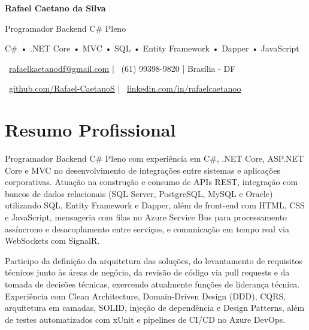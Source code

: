 \documentclass[11pt,a4paper]{article}
\begin{document}

\begin{center}

{\Huge\bfseries Rafael Caetano da Silva}

\vspace{5pt}

{\Large Programador Backend C\# Pleno}

\vspace{4pt}

{\small
C\# • .NET Core • MVC • SQL • Entity Framework • Dapper • JavaScript
}

\vspace{6pt}

\small

\faEnvelope\
\href{mailto:rafaelkaetanodf@gmail.com}{rafaelkaetanodf@gmail.com}
\quad|\quad
\faPhone\
(61) 99398-9820
\quad|\quad
\faMapMarker*
Brasília - DF

\vspace{3pt}

\faGithub\
\href{https://github.com/Rafael-CaetanoS}{github.com/Rafael-CaetanoS}
\quad|\quad
\faLinkedin\
\href{https://linkedin.com/in/rafaelcaetanoo}{linkedin.com/in/rafaelcaetanoo}

\end{center}

\vspace{-0.2cm}
\section{Resumo Profissional}

Programador Backend C\# Pleno com experiência em C\#, .NET Core, ASP.NET Core e MVC no desenvolvimento de integrações entre sistemas e aplicações corporativas. Atuação na construção e consumo de APIs REST, integração com bancos de dados relacionais (SQL Server, PostgreSQL, MySQL e Oracle) utilizando SQL, Entity Framework e Dapper, além de front-end com HTML, CSS e JavaScript, mensageria com filas no Azure Service Bus para processamento assíncrono e desacoplamento entre serviços, e comunicação em tempo real via WebSockets com SignalR.

\vspace{0.15cm}

Participo da definição da arquitetura das soluções, do levantamento de requisitos técnicos junto às áreas de negócio, da revisão de código via pull requests e da tomada de decisões técnicas, exercendo atualmente funções de liderança técnica. Experiência com Clean Architecture, Domain-Driven Design (DDD), CQRS, arquitetura em camadas, SOLID, injeção de dependência e Design Patterns, além de testes automatizados com xUnit e pipelines de CI/CD no Azure DevOps.
\end{document}
